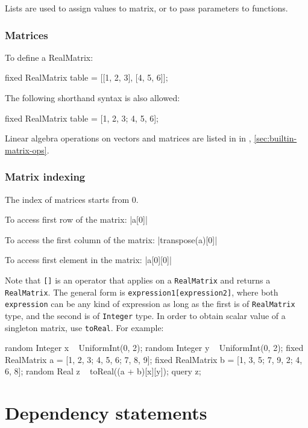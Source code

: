 \documentclass[12pt]{article}
\begin{document}
Lists are used to assign values to matrix, or to pass parameters to functions.

\subsubsection{Matrices}\label{matrix-section}
To define a RealMatrix:
\begin{blogcode}
fixed RealMatrix table = [[1, 2, 3], [4, 5, 6]];
\end{blogcode}
The following shorthand syntax is also allowed:
\begin{blogcode}
fixed RealMatrix table = [1, 2, 3; 4, 5, 6];
\end{blogcode}


Linear algebra operations on vectors and matrices are listed in
in , \ref{sec:builtin-matrix-ops}.

\subsubsection{Matrix indexing}\label{matrix-index-section}
The index of matrices starts from 0. 

To access first row of the matrix:
\blog|a[0]|

To access the first column of the matrix:
\blog|transpose(a)[0]|

To access first element in the matrix:
\blog|a[0][0]|

Note that \verb|[]| is an operator that applies on a \verb|RealMatrix| and returns a \verb|RealMatrix|. The general form is \verb|expression1[expression2]|, where both \verb|expression| can be any kind of expression as long as the first is of \verb|RealMatrix| type, and the second is of \verb|Integer| type. In order to obtain scalar value of a singleton matrix, use \verb|toReal|. For example:

\begin{blogcode}
random Integer x ~ UniformInt(0, 2);
random Integer y ~ UniformInt(0, 2);
fixed RealMatrix a = [1, 2, 3; 4, 5, 6; 7, 8, 9];
fixed RealMatrix b = [1, 3, 5; 7, 9, 2; 4, 6, 8];
random Real z ~ toReal((a + b)[x][y]);
query z;
\end{blogcode}


\section{Dependency statements}\label{dependency-section}

\end{document}
